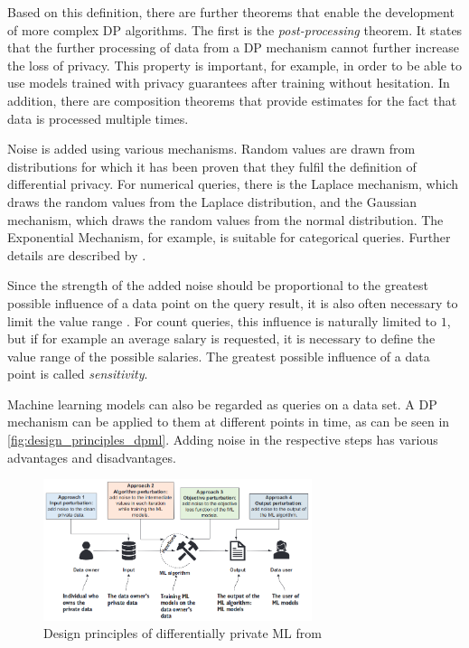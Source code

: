 Based on this definition, there are further theorems that enable the development of more complex DP algorithms. The first is the \textit{post-processing} theorem. It states that the further processing of data from a DP mechanism cannot further increase the loss of privacy. This property is important, for example, in order to be able to use models trained with privacy guarantees after training without hesitation. In addition, there are composition theorems that provide estimates for the fact that data is processed multiple times.

Noise is added using various mechanisms. Random values are drawn from distributions for which it has been proven that they fulfil the definition of differential privacy. For numerical queries, there is the Laplace mechanism, which draws the random values from the Laplace distribution, and the Gaussian mechanism, which draws the random values from the normal distribution. The Exponential Mechanism, for example, is suitable for categorical queries. Further details are described by \textcite{chang:2023}.

Since the strength of the added noise should be proportional to the greatest possible influence of a data point on the query result, it is also often necessary to limit the value range \parencite[p.31]{chang:2023}. For count queries, this influence is naturally limited to $1$, but if for example an average salary is requested, it is necessary to define the value range of the possible salaries. The greatest possible influence of a data point is called \textit{sensitivity}.

Machine learning models can also be regarded as queries on a data set. A DP mechanism can be applied to them at different points in time, as can be seen in \autoref{fig:design_principles_dpml}. Adding noise in the respective steps has various advantages and disadvantages.

\begin{figure}[tb]
  \centering
  \includegraphics[width=0.7\textwidth]{Bilder/design_principles_dpml.png}
  \caption{Design principles of differentially private ML from \textcite{chang:2023}}
  \label{fig:design_principles_dpml}
\end{figure}

